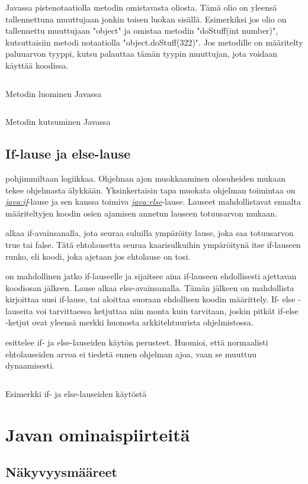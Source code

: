 \documentclass{tufte-book}
\newcommand{\java}[1]{\underline{\gls{java:#1}}}
\newcommand{\newjava}[1]{\textit{\java{#1}}}
\newcommand{\code}[3]{
\begin{listing}
    \inputminted{java}{OhjelmointiopasEsimerkit/src/#1/#2.java}
    \caption{#3}
    \label{Java-#1-#2}
\end{listing}
}
\begin{document}
 Javassa pistenotaatiolla metodin omistavasta oliosta. Tämä
olio on yleensä tallennettuna muuttujaan jonkin toisen luokan sisällä. Esimerkiksi jos olio
on tallennettu muuttujaan "object" ja omistaa metodin "doStuff(int number)", kutsuttaisiin
metodi notaatiolla "object.doStuff(322)". Jos metodille on määritelty paluuarvon tyyppi, kutsu
palauttaa tämän tyypin muuttujan, jota voidaan käyttää koodissa.

\code{week2}{BasicMethodChild}{Metodin luominen Javassa}
\code{week2}{BasicMethod}{Metodin kutsuminen Javassa}

\subsection{If-lause ja else-lause}

 pohjimmiltaan logiikkaa. Ohjelman ajon muokkaaminen olosuheiden
mukaan tekee ohjelmasta älykkään. Yksinkertaisin tapa muokata ohjelman toimintaa on
\newjava{if}-lause ja sen kanssa toimiva \newjava{else}-lause. Lauseet mahdollistavat ennalta
määriteltyjen koodin osien ajamisen annetun lauseen totuusarvon mukaan.

 alkaa if-avainsanalla, jota seuraa suluilla ympäröity lause, joka saa
totuusarvon true tai false. Tätä ehtolausetta seuraa kaarisulkuihin ympäröitynä itse if-lauseen
runko, eli koodi, joka ajetaan jos ehtolause on tosi.

 on mahdollinen jatko if-lauseelle ja sijaitsee aina if-lauseen
ehdollisesti ajettavan koodiosan jälkeen. Lause alkaa else-avainsanalla. Tämän jälkeen on
mahdollista kirjoittaa uusi if-lause, tai aloittaa suoraan ehdollisen koodin määrittely. If-
else -lauseita voi tarvittaessa ketjuttaa niin monta kuin tarvitaan, joskin pitkät if-else
-ketjut ovat yleensä merkki huonosta arkkitehtuurista ohjelmistossa.

 esittelee if- ja else-lauseiden käytön perusteet. Huomioi,
että normaalisti ehtolauseiden arvoa ei tiedetä ennen ohjelman ajoa, vaan se muuttuu dynaamisesti.

\code{week2}{BasicIfElse}{Esimerkki if- ja else-lauseiden käytöstä}

\section{Javan ominaispiirteitä}

\subsection{Näkyvyysmääreet}
\end{document}
